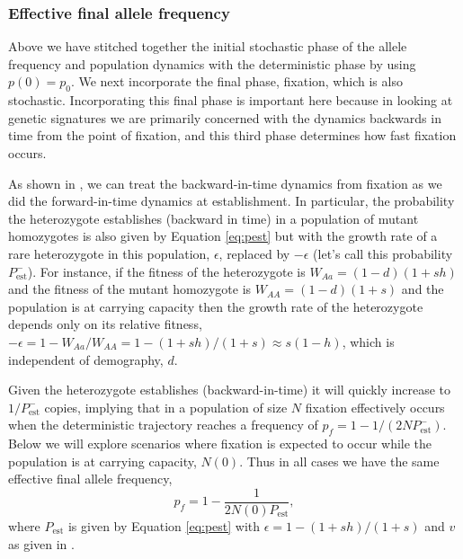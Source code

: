 \documentclass[]{article}
\begin{document}
\subsubsection*{Effective final allele frequency}
\label{sec:final_frequency}

Above we have stitched together the initial stochastic phase of the allele frequency and population dynamics with the deterministic phase by using $p(0)=p_0$. 
We next incorporate the final phase, fixation, which is also stochastic.
Incorporating this final phase is important here \citep[as opposed to studies that predict only the forward-time dynamics; e.g.,][]{orr2014population} because in looking at genetic signatures we are primarily concerned with the dynamics backwards in time from the point of fixation, and this third phase determines how fast fixation occurs.

As shown in \cite{martin2015simple}, we can treat the backward-in-time dynamics from fixation as we did the forward-in-time dynamics at establishment. 
In particular, the probability the heterozygote establishes (backward in time) in a population of mutant homozygotes is also given by Equation \ref{eq:pest} but with the growth rate of a rare heterozygote in this population, $\epsilon$, replaced by $-\epsilon$ (let's call this probability $P_\mathrm{est}^-$).
For instance, if the fitness of the heterozygote is $W_{Aa} = (1-d)(1+ s h)$ and the fitness of the mutant homozygote is $W_{AA} = (1-d)(1+s)$ and the population is at carrying capacity then the growth rate of the heterozygote depends only on its relative fitness, $-\epsilon = 1 - W_{Aa}/W_{AA} = 1 - (1+ s h)/(1+ s) \approx s(1-h)$, which is independent of demography, $d$.

Given the heterozygote establishes (backward-in-time) it will quickly increase to $1/P_\mathrm{est}^-$ copies, implying that in a population of size $N$ fixation effectively occurs when the deterministic trajectory reaches a frequency of $p_f = 1-1/(2 N P_\mathrm{est}^-)$.
Below we will explore scenarios where fixation is expected to occur while the population is at carrying capacity, $N(0)$. 
Thus in all cases we have the same effective final allele frequency,
\begin{equation}\label{eq:pf}
p_f = 1 - \frac{1}{2 N(0) P_\mathrm{est}},
\end{equation}
where $P_\mathrm{est}$ is given by Equation \ref{eq:pest} with $\epsilon = 1 - (1 + s h)/(1 +  s)$ and $v$ as given in .
\end{document}
